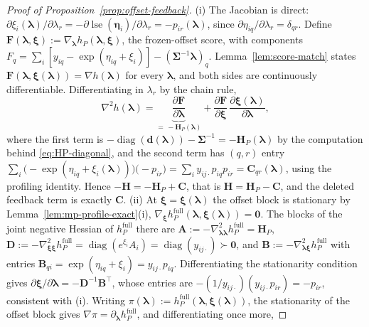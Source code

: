 \begin{proof}[Proof of Proposition~\ref{prop:offset-feedback}]
(i) The Jacobian is direct: $\partial\xi_{i}(\bm{\lambda})/\partial\lambda_{r}=-\partial\operatorname{lse}(\bm{\eta}_{i})/\partial\lambda_{r}=-p_{ir}(\bm{\lambda})$, since $\partial\eta_{iq}/\partial\lambda_{r}=\delta_{qr}$. Define $\mathbf{F}(\bm{\lambda},\bm{\xi}):=\nabla_{\bm{\lambda}}h_{P}(\bm{\lambda},\bm{\xi})$, the frozen-offset score, with components $F_{q}=\sum_{i}[y_{iq}-\exp(\eta_{iq}+\xi_{i})]-(\bm{\Sigma}^{-1}\bm{\lambda})_{q}$. Lemma~\ref{lem:score-match} states $\mathbf{F}(\bm{\lambda},\bm{\xi}(\bm{\lambda}))=\nabla h(\bm{\lambda})$ for every $\bm{\lambda}$, and both sides are continuously differentiable. Differentiating in $\lambda_{r}$ by the chain rule,
\begin{equation}
    \nabla^{2}h(\bm{\lambda})=\underbrace{\frac{\partial\mathbf{F}}{\partial\bm{\lambda}}}_{=\,-\mathbf{H}_{P}(\bm{\lambda})}+\frac{\partial\mathbf{F}}{\partial\bm{\xi}}\,\frac{\partial\bm{\xi}(\bm{\lambda})}{\partial\bm{\lambda}},
    \label{eq:score-chain}
\end{equation}
where the first term is $-\operatorname{diag}(\mathbf{d}(\bm{\lambda}))-\bm{\Sigma}^{-1}=-\mathbf{H}_{P}(\bm{\lambda})$ by the computation behind \eqref{eq:HP-diagonal}, and the second term has $(q,r)$ entry $\sum_{i}\big(-\exp(\eta_{iq}+\xi_{i}(\bm{\lambda}))\big)\big(-p_{ir}\big)=\sum_{i}y_{ij\cdot}p_{iq}p_{ir}=\mathbf{C}_{qr}(\bm{\lambda})$, using the profiling identity. Hence $-\mathbf{H}=-\mathbf{H}_{P}+\mathbf{C}$, that is $\mathbf{H}=\mathbf{H}_{P}-\mathbf{C}$, and the deleted feedback term is exactly $\mathbf{C}$. (ii) At $\bm{\xi}=\bm{\xi}(\bm{\lambda})$ the offset block is stationary by Lemma~\ref{lem:mp-profile-exact}(i), $\nabla_{\bm{\xi}}h_{P}^{\mathrm{full}}(\bm{\lambda},\bm{\xi}(\bm{\lambda}))=\bm{0}$. The blocks of the joint negative Hessian of $h_{P}^{\mathrm{full}}$ there are $\mathbf{A}:=-\nabla^{2}_{\bm{\lambda}\bm{\lambda}}h_{P}^{\mathrm{full}}=\mathbf{H}_{P}$, $\mathbf{D}:=-\nabla^{2}_{\bm{\xi}\bm{\xi}}h_{P}^{\mathrm{full}}=\operatorname{diag}(e^{\xi_{i}}A_{i})=\operatorname{diag}(y_{ij\cdot})\succ\bm{0}$, and $\mathbf{B}:=-\nabla^{2}_{\bm{\lambda}\bm{\xi}}h_{P}^{\mathrm{full}}$ with entries $\mathbf{B}_{qi}=\exp(\eta_{iq}+\xi_{i})=y_{ij\cdot}p_{iq}$. Differentiating the stationarity condition gives $\partial\bm{\xi}/\partial\bm{\lambda}=-\mathbf{D}^{-1}\mathbf{B}^{\top}$, whose entries are $-(1/y_{ij\cdot})(y_{ij\cdot}p_{ir})=-p_{ir}$, consistent with (i). Writing $\pi(\bm{\lambda}):=h_{P}^{\mathrm{full}}(\bm{\lambda},\bm{\xi}(\bm{\lambda}))$, the stationarity of the offset block gives $\nabla\pi=\partial_{\bm{\lambda}}h_{P}^{\mathrm{full}}$, and differentiating once more,

\end{proof}
